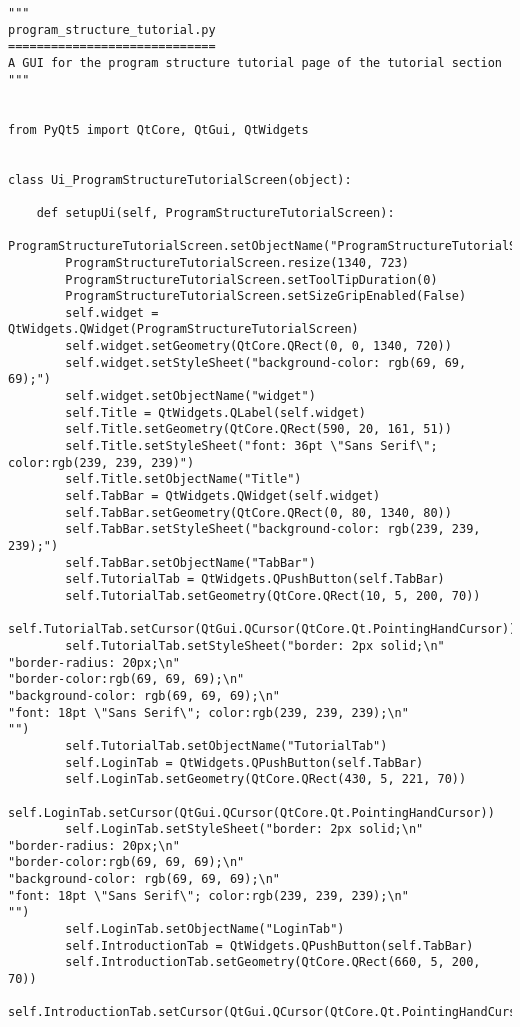 \documentclass{article}
\begin{document}
\begin{lstlisting}
"""
program_structure_tutorial.py
=============================
A GUI for the program structure tutorial page of the tutorial section
"""


from PyQt5 import QtCore, QtGui, QtWidgets


class Ui_ProgramStructureTutorialScreen(object):

    def setupUi(self, ProgramStructureTutorialScreen):
        ProgramStructureTutorialScreen.setObjectName("ProgramStructureTutorialScreen")
        ProgramStructureTutorialScreen.resize(1340, 723)
        ProgramStructureTutorialScreen.setToolTipDuration(0)
        ProgramStructureTutorialScreen.setSizeGripEnabled(False)
        self.widget = QtWidgets.QWidget(ProgramStructureTutorialScreen)
        self.widget.setGeometry(QtCore.QRect(0, 0, 1340, 720))
        self.widget.setStyleSheet("background-color: rgb(69, 69, 69);")
        self.widget.setObjectName("widget")
        self.Title = QtWidgets.QLabel(self.widget)
        self.Title.setGeometry(QtCore.QRect(590, 20, 161, 51))
        self.Title.setStyleSheet("font: 36pt \"Sans Serif\"; color:rgb(239, 239, 239)")
        self.Title.setObjectName("Title")
        self.TabBar = QtWidgets.QWidget(self.widget)
        self.TabBar.setGeometry(QtCore.QRect(0, 80, 1340, 80))
        self.TabBar.setStyleSheet("background-color: rgb(239, 239, 239);")
        self.TabBar.setObjectName("TabBar")
        self.TutorialTab = QtWidgets.QPushButton(self.TabBar)
        self.TutorialTab.setGeometry(QtCore.QRect(10, 5, 200, 70))
        self.TutorialTab.setCursor(QtGui.QCursor(QtCore.Qt.PointingHandCursor))
        self.TutorialTab.setStyleSheet("border: 2px solid;\n"
"border-radius: 20px;\n"
"border-color:rgb(69, 69, 69);\n"
"background-color: rgb(69, 69, 69);\n"
"font: 18pt \"Sans Serif\"; color:rgb(239, 239, 239);\n"
"")
        self.TutorialTab.setObjectName("TutorialTab")
        self.LoginTab = QtWidgets.QPushButton(self.TabBar)
        self.LoginTab.setGeometry(QtCore.QRect(430, 5, 221, 70))
        self.LoginTab.setCursor(QtGui.QCursor(QtCore.Qt.PointingHandCursor))
        self.LoginTab.setStyleSheet("border: 2px solid;\n"
"border-radius: 20px;\n"
"border-color:rgb(69, 69, 69);\n"
"background-color: rgb(69, 69, 69);\n"
"font: 18pt \"Sans Serif\"; color:rgb(239, 239, 239);\n"
"")
        self.LoginTab.setObjectName("LoginTab")
        self.IntroductionTab = QtWidgets.QPushButton(self.TabBar)
        self.IntroductionTab.setGeometry(QtCore.QRect(660, 5, 200, 70))
        self.IntroductionTab.setCursor(QtGui.QCursor(QtCore.Qt.PointingHandCursor))

\end{lstlisting}
\end{document}
